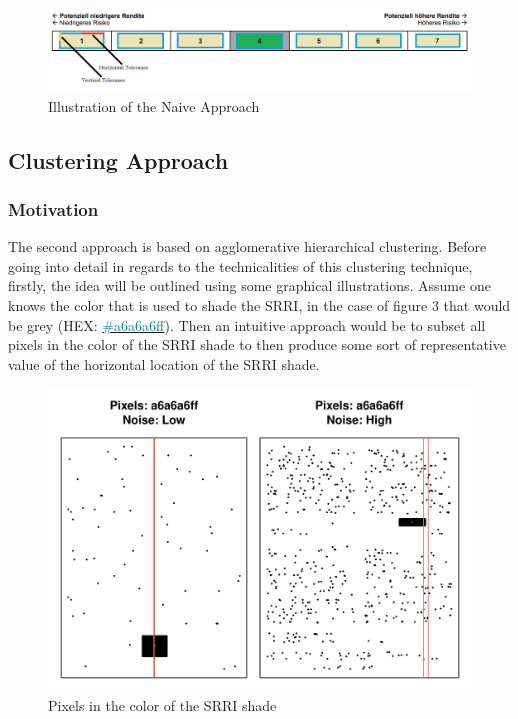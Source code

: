 \documentclass[aodsor,preprint]{imsart}
\numberwithin{equation}{section}
\theoremstyle{plain}
\begin{document}
\begin{figure}[H]
	\includegraphics[width = 12cm]{example_SRRI_graph_naive}
	\caption{Illustration of the Naive Approach}
\end{figure}
\newpage
\subsection{Clustering Approach}
\subsubsection{Motivation}
The second approach is based on agglomerative hierarchical clustering. Before going into detail in regards to the technicalities of this clustering technique, firstly, the idea will be outlined using some graphical illustrations. Assume one knows the color that is used to shade the SRRI, in the case of figure 3 that would be grey (HEX: \href{https://www.color-hex.com/color/a6a6a6}{\textcolor{teal}{\#a6a6a6ff}}). Then an intuitive approach would be to subset all pixels in the color of the SRRI shade to then produce some sort of representative value of the horizontal location of the SRRI shade.

\begin{figure}[H]
	\includegraphics[width = 12cm]{highnoiselownoise.pdf}
	\caption{Pixels in the color of the SRRI shade}
\end{figure}
\end{document}
